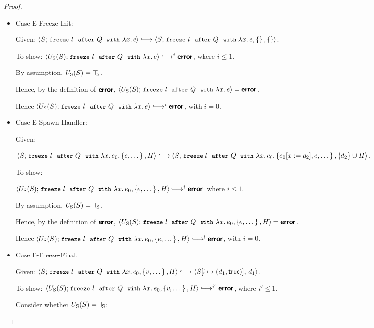 \begin{proof}
\begin{itemize}
  \item Case {\sc E-Freeze-Init}:

    Given: $\config{S}{\freezeafter{l}{Q}{\lam{x}{e}}} \parstepsto
    \config{S}{\freezeafterfull{l}{Q}{\lam{x}{e}}{\setof{}}{\setof{}}}$.

    To show: $\config{\Ustore(S)}{\freezeafter{l}{Q}{\lam{x}{e}}}
    \parstepsto^i \error$, where $i \leq 1$.

    By assumption, $U_{\mathrm{S}}(S) = \top\hspace{-0.85mm}_{\mathrm{S}}$.

    Hence, by the definition of $\textbf{\textsf{error}}$,
    $\langle U_{\mathrm{S}}(S);\, \mbox{\small{\texttt{freeze}}}~l~~{\mbox{\small{\texttt{after}}}}~Q~~{\mbox{\small{\texttt{with}}}}~\lambda x.\,e \rangle = \textbf{\textsf{error}}$.

    Hence $\config{\Ustore(S)}{\freezeafter{l}{Q}{\lam{x}{e}}}
    \parstepsto^i \error$, with $i = 0$.

  \item Case {\sc E-Spawn-Handler}:

    Given:

    $\config{S}{\freezeafterfull{l}{Q}{\lam{x}{e_0}}{\setof{e,
          \dots}}{H}} \parstepsto \\
    \config{S}{\freezeafterfull{l}{Q}{\lam{x}{e_0}}{\setof{\subst{e_0}{x}{d_2},
          e, \dots}}{\{d_2\}\cup H}}$.

    To show:

    $\config{\Ustore(S)}{\freezeafterfull{l}{Q}{\lam{x}{e_0}}{\setof{e,
          \dots}}{H}} \parstepsto^i \error$, where $i \leq 1$.

    By assumption, $U_{\mathrm{S}}(S) = \top\hspace{-0.85mm}_{\mathrm{S}}$.

    Hence, by the definition of $\textbf{\textsf{error}}$,
    $\langle U_{\mathrm{S}}(S);\, \mbox{\small{\texttt{freeze}}}~l~~{\mbox{\small{\texttt{after}}}}~Q~~{\mbox{\small{\texttt{with}}}}~\lambda x.\,e_0, \left\{e,
          \dots\right\}, H \rangle = \textbf{\textsf{error}}$.

    Hence
    $\config{\Ustore(S)}{\freezeafterfull{l}{Q}{\lam{x}{e_0}}{\setof{e,
          \dots}}{H}} \parstepsto^i \error$, with $i = 0$.

  \item Case {\sc E-Freeze-Final}:

    Given:
    $\config{S}{\freezeafterfull{l}{Q}{\lam{x}{e_0}}{\setof{v,
          \dots}}{H}} \parstepsto
    \config{\extS{S}{l}{d_1}{\frozentrue}}{d_1}$.

    To show:
    $\config{\Ustore(S)}{\freezeafterfull{l}{Q}{\lam{x}{e_0}}{\setof{v,
          \dots}}{H}} \parstepsto^{i'} \error$, where $i' \leq 1$.

    Consider whether $U_{\mathrm{S}}(S) = \top\hspace{-0.85mm}_{\mathrm{S}}$:
    \begin{itemize}


\end{itemize}
\end{itemize}
\end{proof}
